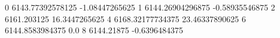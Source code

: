 0 6143.77392578125 -1.08447265625
1 6144.26904296875 -0.58935546875
2 6161.203125 16.3447265625
4 6168.32177734375 23.46337890625
6 6144.8583984375 0.0
8 6144.21875 -0.6396484375
